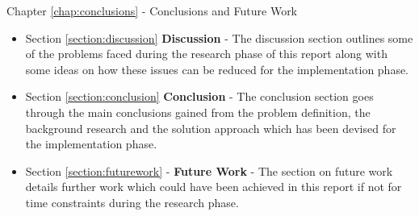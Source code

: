 Chapter \ref{chap:conclusions} - Conclusions and Future Work

\begin{itemize}
    \item Section \ref{section:discussion} \textbf{Discussion} - The discussion section outlines some of the problems faced during the research phase of this report along with some ideas on how these issues can be reduced for the implementation phase.
    
    \item Section \ref{section:conclusion} \textbf{Conclusion} - The conclusion section goes through the main conclusions gained from the problem definition, the background research and the solution approach which has been devised for the implementation phase.
    
    \item Section \ref{section:futurework} - \textbf{Future Work} - The section on future work details further work which could have been achieved in this report if not for time constraints during the research phase.
\end{itemize}